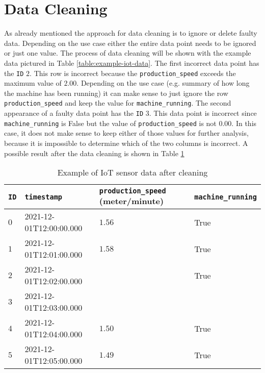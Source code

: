 \section{Data Cleaning}
As already mentioned the approach for data cleaning is to ignore or delete faulty data. Depending on the use case either the entire data point needs to be ignored or just one value. The process of data cleaning will be shown with the example data pictured in Table \ref{table:example-iot-data}.
The first incorrect data point has the \verb|ID| $2$. This row is incorrect because the \verb|production_speed| exceeds the maximum value of $2.00$. Depending on the use case (e.g. summary of how long the machine has been running) it can make sense to just ignore the row \verb|production_speed| and keep the value for \verb|machine_running|. The second appearance of a faulty data point has the \verb|ID| $3$. This data point is incorrect since \verb|machine_running| is False but the value of \verb|production_speed| is not $0.00$. In this case, it does not make sense to keep either of those values for further analysis, because it is impossible to determine which of the two columns is incorrect. A possible result after the data cleaning is shown in Table \ref{table:example-iot-data-after-cleaning}
\begin{table}[ht]
\begin{tabular}{|l|l|l|l|}
\hline
\verb|ID| & \verb|timestamp|        & \verb|production_speed| (meter/minute) & \verb|machine_running| \\ \hline
$0$       & 2021-12-01T12:00:00.000 & $1.56$                                 & True                   \\ \hline
$1$       & 2021-12-01T12:01:00.000 & $1.58$                                 & True                   \\ \hline
$2$       & 2021-12-01T12:02:00.000 &                                        & True                   \\ \hline
$3$       & 2021-12-01T12:03:00.000 &                                        &                        \\ \hline
$4$       & 2021-12-01T12:04:00.000 & $1.50$                                 & True                   \\ \hline
$5$       & 2021-12-01T12:05:00.000 & $1.49$                                 & True                   \\ \hline
\end{tabular}
\caption{Example of IoT sensor data after cleaning}
\label{table:example-iot-data-after-cleaning}
\end{table}

